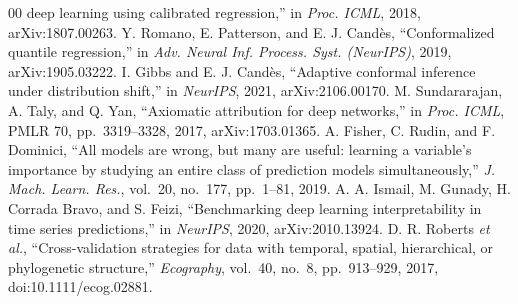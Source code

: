 \documentclass[conference]{IEEEtran}
\begin{document}
\begin{thebibliography}{00}
deep learning using calibrated regression,'' in \emph{Proc. ICML}, 2018, arXiv:1807.00263.
 Y. Romano, E. Patterson, and E. J. Cand\`es, ``Conformalized quantile
regression,'' in \emph{Adv. Neural Inf. Process. Syst. (NeurIPS)}, 2019, arXiv:1905.03222.
 I. Gibbs and E. J. Cand\`es, ``Adaptive conformal inference under
distribution shift,'' in \emph{NeurIPS}, 2021, arXiv:2106.00170.
 M. Sundararajan, A. Taly, and Q. Yan, ``Axiomatic attribution
for deep networks,'' in \emph{Proc. ICML}, PMLR 70, pp.~3319--3328, 2017, arXiv:1703.01365.
 A. Fisher, C. Rudin, and F. Dominici, ``All models are wrong, but many
are useful: learning a variable's importance by studying an entire class of prediction
models simultaneously,'' \emph{J. Mach. Learn. Res.}, vol.~20, no.~177, pp.~1--81, 2019.
 A. A. Ismail, M. Gunady, H. Corrada Bravo, and S. Feizi,
``Benchmarking deep learning interpretability in time series predictions,'' in
\emph{NeurIPS}, 2020, arXiv:2010.13924.
 D. R. Roberts \emph{et al.}, ``Cross-validation strategies for data
with temporal, spatial, hierarchical, or phylogenetic structure,'' \emph{Ecography},
vol.~40, no.~8, pp.~913--929, 2017, doi:10.1111/ecog.02881.
\end{thebibliography}
\end{document}
